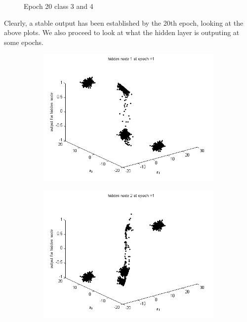 \documentclass{article}
\begin{document}
\begin{flushleft}
\begin{figure}
\begin{subfigure}{.5\textwidth}
\end{subfigure}
\caption{Epoch 20 class 3 and 4}
\end{figure}
Clearly, a stable output has been established by the 20th epoch, looking at the above plots. We also proceed to look at what the hidden layer is outputing at some epochs. \\[10pt]
\begin{figure}
\begin{subfigure}{.3\textwidth}
  \centering
  \includegraphics[width=.8\linewidth]{Classification/linearlySeparable/h1_1}
 
\end{subfigure}%
\begin{subfigure}{.3\textwidth}
  \centering
  \includegraphics[width=.8\linewidth]{Classification/linearlySeparable/h1_2}
  

\end{subfigure}
\end{figure}
\end{flushleft}
\end{document}
